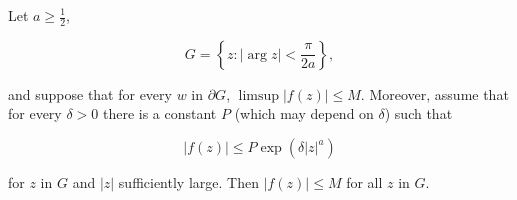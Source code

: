 Let $a \geq \frac{1}{2}$,

$$G = \left\{ z : |\arg z| < \frac{\pi}{2a} \right\},$$

and suppose that for every $w$ in $\partial G$, $\limsup |f(z)| \leq M$. Moreover, assume that for every $\delta > 0$ there is a constant $P$ (which may depend on $\delta$) such that

$$|f(z)| \leq P \exp (\delta |z|^a)$$

for $z$ in $G$ and $|z|$ sufficiently large. Then $|f(z)| \leq M$ for all $z$ in $G$.